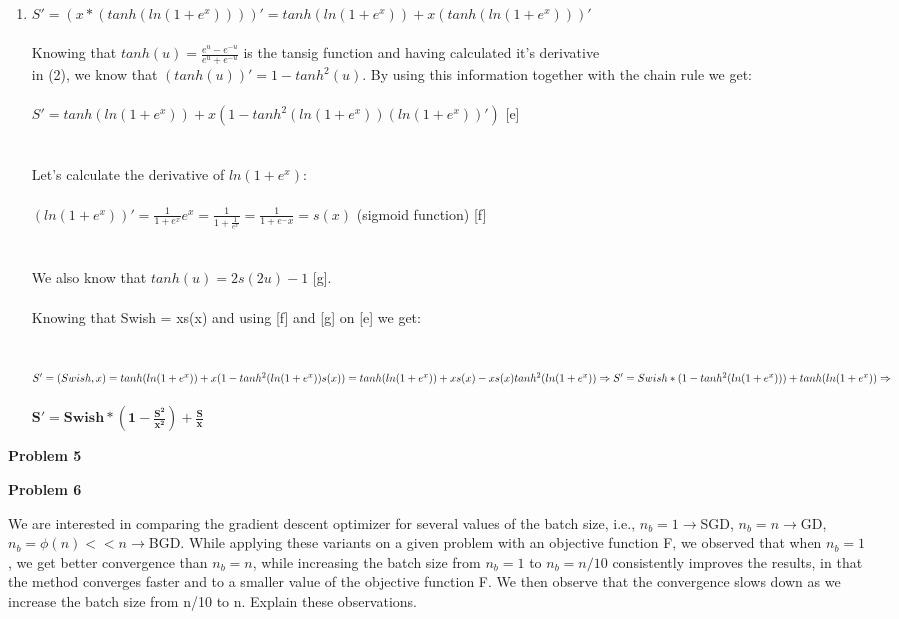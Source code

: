 \documentclass{article}
\begin{document}
\begin{enumerate}
  \item $S' = (x*(tanh(ln(1+e^{x}))))' = tanh(ln(1+e^{x})) + x(tanh(ln(1+e^{x})))'$ \\ \\ Knowing that $tanh(u) = \frac{e^{u}-e^{-u}}{e^{u}+e^{-u}}$ is the tansig function and having calculated it's derivative \\ 
  in (2), we know that $(tanh(u))' = 1 - tanh^2(u)$. By using this information together with the chain rule we get: \\ \\ $S' = tanh(ln(1+e^{x})) + x(1 - tanh^2(ln(1+e^{x}))(ln(1+e^{x}))')$ \hspace{0.5cm} [e] \\ \\ \\
  Let's calculate the derivative of $ln(1+e^{x})$: \\ \\$(ln(1+e^{x}))' = \frac{1}{1+e^{x}}e^x = \frac{1}{1+\frac{1}{e^x}} = \frac{1}{1+e^-x} = s(x)$ (sigmoid function)\hspace{0.3cm} [f]\\ \\ \\We also know that
  $tanh(u) = 2s(2u)-1$ \hspace{0.3cm} [g]. \\ \\ Knowing that Swish = xs(x) and using [f] and [g] on [e] we get: \\ \\ \\$S' = (Swish,x) = tanh(ln(1+e^{x})) + x(1 - tanh^2(ln(1+e^{x}))s(x)) =\\ \\ tanh(ln(1+e^{x})) + xs(x) - xs(x)tanh^2(ln(1+e^{x}))
  \Rightarrow \\ \\{S' = Swish*(1 - tanh^2(ln(1+e^{x}))) +tanh(ln(1+e^{x})) \Rightarrow}$ \\ \\$\bm{S' = Swish*(1-\frac{S^2}{x^2}) + \frac{S}{x}}$
\end{enumerate}

\newpage
\noindent \textbf{Problem 5}

\newpage
\noindent \textbf{Problem 6}

\noindent We are interested in comparing the gradient descent optimizer for several values of the
batch size, i.e., $n_b=1\rightarrow$SGD, $n_b=n\rightarrow$GD, $n_b=\phi(n)<<n\rightarrow$BGD. While applying these
variants on a given problem with an objective function F, we observed that when $n_b=1$,
we get better convergence than $n_b=n$, while increasing the batch size from $n_b=1$ to
$n_b=n/10$ consistently improves the results, in that the method converges faster and to a
smaller value of the objective function F. We then observe that the convergence slows
down as we increase the batch size from n/10 to n.
Explain these observations. \\ \\
\end{document}
